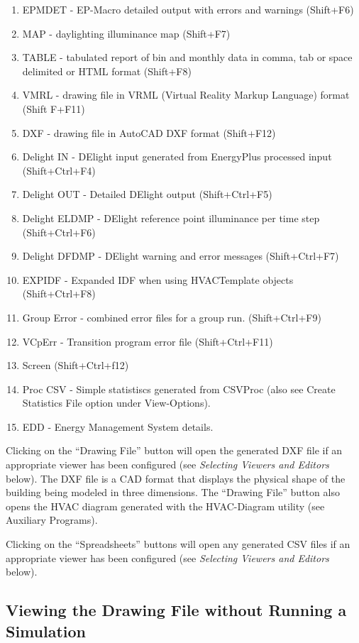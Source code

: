 \begin{enumerate}
\item
  EPMDET - EP-Macro detailed output with errors and warnings (Shift+F6)
\item
  MAP - daylighting illuminance map (Shift+F7)
\item
  TABLE - tabulated report of bin and monthly data in comma, tab or space delimited or HTML format (Shift+F8)
\item
  VMRL - drawing file in VRML (Virtual Reality Markup Language) format (Shift F+F11)
\item
  DXF - drawing file in AutoCAD DXF format (Shift+F12)
\item
  Delight IN - DElight input generated from EnergyPlus processed input (Shift+Ctrl+F4)
\item
  Delight OUT - Detailed DElight output (Shift+Ctrl+F5)
\item
  Delight ELDMP - DElight reference point illuminance per time step (Shift+Ctrl+F6)
\item
  Delight DFDMP - DElight warning and error messages (Shift+Ctrl+F7)
\item
  EXPIDF - Expanded IDF when using HVACTemplate objects (Shift+Ctrl+F8)
\item
  Group Error - combined error files for a group run. (Shift+Ctrl+F9)
\item
  VCpErr - Transition program error file (Shift+Ctrl+F11)
\item
  Screen (Shift+Ctrl+f12)
\item
  Proc CSV - Simple statistiscs generated from CSVProc (also see Create Statistics File option under View-Options).
\item
  EDD - Energy Management System details.
\end{enumerate}

Clicking on the ``Drawing File'' button will open the generated DXF file if an appropriate viewer has been configured (see \emph{Selecting Viewers and Editors} below). The DXF file is a CAD format that displays the physical shape of the building being modeled in three dimensions. The ``Drawing File'' button also opens the HVAC diagram generated with the HVAC-Diagram utility (see Auxiliary Programs).

Clicking on the ``Spreadsheets'' buttons will open any generated CSV files if an appropriate viewer has been configured (see \emph{Selecting Viewers and Editors} below).

\subsection{Viewing the Drawing File without Running a Simulation}\label{viewing-the-drawing-file-without-running-a-simulation}

